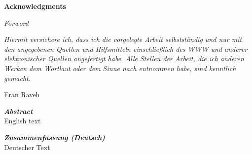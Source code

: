 \vspace*{9cm}
\begin{center}
\end{center}
\newpage

\vspace*{3cm}
\begin{center}
    {\textbf{\huge Acknowledgments}}\\[0.3cm]
    \Large
\end{center}
\newpage

{\calligra \Huge \textit{Forword}}
\clearpage        

\begin{multicols}{2}
    \vspace*{\textheight}
    \columnbreak
    \vspace*{3cm}
    \Large{\textit{Hiermit versichere ich, dass ich die vorgelegte Arbeit selbstst{\"a}ndig und nur mit den angegebenen Quellen und Hilfsmitteln einschließlich des WWW und anderer elektronischer Quellen angefertigt habe.
            Alle Stellen der Arbeit, die ich anderen Werken dem Wortlaut oder dem Sinne nach entnommen habe, sind kenntlich gemacht.}}
    \vspace{0.55cm}
    \begin{flushright}
		{Eran Raveh}
    \end{flushright}
\end{multicols}
\cleardoublepage

\begin{center}
    \vspace*{3.3cm}
    \textit{\textbf{\huge Abstract}}\\[0.3cm]
    \Large
    English text
\end{center}
\clearpage

\begin{center}
     \vspace*{3.3cm}
     \textit{\textbf{\huge Zusammenfassung (Deutsch)}}\\[0.3cm]
     \Large
	 \foreignlanguage{german}{
	 	Deutscher Text
	 }
\end{center}
\cleardoublepage

\renewcommand{\contentsname}{\hfill\bfseries\Huge Table of Contents\hfill}
\renewcommand{\cftaftertoctitle}{\hfill}
\setlength\cftaftertoctitleskip{60pt} %
\thispagestyle{empty}
{
    {\large{} \tableofcontents \normalsize{}}}

